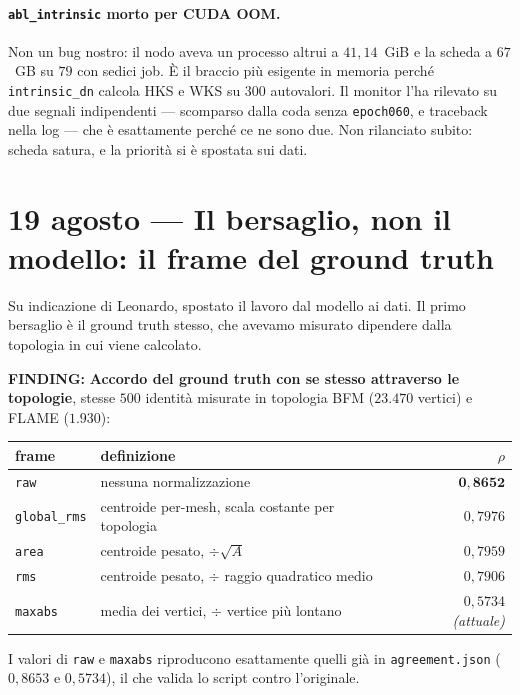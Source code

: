 \documentclass[11pt,a4paper]{article}
\newcommand{\finding}[1]{\textcolor{finding}{\textbf{FINDING:}} #1}
\begin{document}
\paragraph{\texttt{abl\_intrinsic} morto per CUDA OOM.} Non un bug nostro: il nodo aveva un
processo altrui a $41{,}14$~GiB e la scheda a $67$~GB su $79$ con sedici job. \`E il braccio pi\`u
esigente in memoria perch\'e \texttt{intrinsic\_dn} calcola HKS e WKS su $300$ autovalori. Il
monitor l'ha rilevato su due segnali indipendenti --- scomparso dalla coda senza
\texttt{epoch060}, e traceback nella log --- che \`e esattamente perch\'e ce ne sono due.
Non rilanciato subito: scheda satura, e la priorit\`a si \`e spostata sui dati.


\section{19 agosto --- Il bersaglio, non il modello: il frame del ground truth}

Su indicazione di Leonardo, spostato il lavoro dal modello ai dati. Il primo bersaglio \`e il
ground truth stesso, che avevamo misurato dipendere dalla topologia in cui viene calcolato.

\finding{\textbf{Accordo del ground truth con se stesso attraverso le topologie}, stesse $500$
identit\`a misurate in topologia BFM ($23{.}470$ vertici) e FLAME ($1{.}930$):}

\begin{center}\small
\begin{tabular}{llr}
\toprule
frame & definizione & $\rho$ \\
\midrule
\texttt{raw}        & nessuna normalizzazione & $\mathbf{0{,}8652}$ \\
\texttt{global\_rms}& centroide per-mesh, scala costante per topologia & $0{,}7976$ \\
\texttt{area}       & centroide pesato, $\div \sqrt{A}$ & $0{,}7959$ \\
\texttt{rms}        & centroide pesato, $\div$ raggio quadratico medio & $0{,}7906$ \\
\texttt{maxabs}     & media dei vertici, $\div$ vertice pi\`u lontano & $0{,}5734$ \emph{(attuale)} \\
\bottomrule
\end{tabular}
\end{center}

I valori di \texttt{raw} e \texttt{maxabs} riproducono esattamente quelli gi\`a in
\texttt{agreement.json} ($0{,}8653$ e $0{,}5734$), il che valida lo script contro l'originale.
\end{document}
